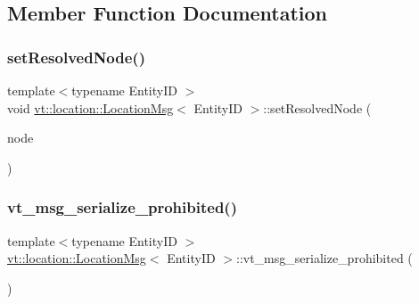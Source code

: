 \subsection{Member Function Documentation}
\mbox{\label{structvt_1_1location_1_1_location_msg_a98f01158208640bb88e0d4583694f9bb}} 
\subsubsection{\texorpdfstring{set\+Resolved\+Node()}{setResolvedNode()}}
{\footnotesize\ttfamily template$<$typename Entity\+ID $>$ \\
void \hyperlink{structvt_1_1location_1_1_location_msg}{vt\+::location\+::\+Location\+Msg}$<$ Entity\+ID $>$\+::set\+Resolved\+Node (\begin{DoxyParamCaption}\item[{\hyperlink{namespacevt_a866da9d0efc19c0a1ce79e9e492f47e2}{Node\+Type} const \&}]{node }\end{DoxyParamCaption})\hspace{0.3cm}{\ttfamily [inline]}}

\mbox{\label{structvt_1_1location_1_1_location_msg_a772844def532d4cbe03f197d621d501e}} 
\subsubsection{\texorpdfstring{vt\+\_\+msg\+\_\+serialize\+\_\+prohibited()}{vt\_msg\_serialize\_prohibited()}}
{\footnotesize\ttfamily template$<$typename Entity\+ID $>$ \\
\hyperlink{structvt_1_1location_1_1_location_msg}{vt\+::location\+::\+Location\+Msg}$<$ Entity\+ID $>$\+::vt\+\_\+msg\+\_\+serialize\+\_\+prohibited (\begin{DoxyParamCaption}{ }\end{DoxyParamCaption})}



